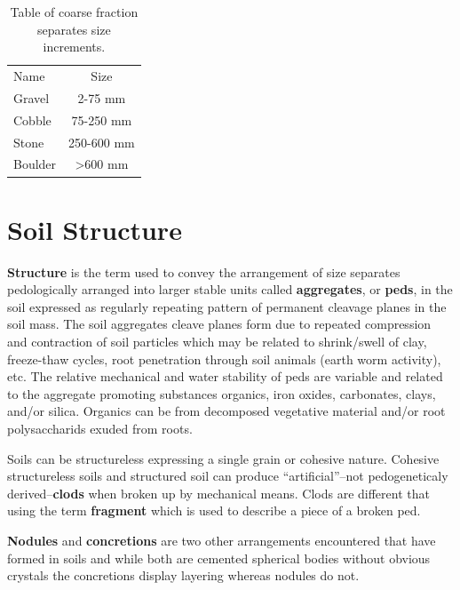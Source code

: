 \documentclass[letterpaper, 12pt]{article}
\begin{document}
\begin{table}[!htbp]
\centering
\caption{Table of coarse fraction separates size increments.}
\label{tab:coarsefractionsizenames}
\begin{tabular}{|l c|}
\hline
Name        &  Size                \\ \hhline{|==|}
Gravel      & 2-75 mm              \\
Cobble      & 75-250 mm            \\
Stone       & 250-600 mm           \\
Boulder     & \textgreater{}600 mm \\
\hline
\end{tabular}
\end{table}

    
\section{Soil Structure}
\label{structure}
    
\textbf{Structure} is the term used to convey the arrangement of size separates pedologically arranged into larger stable units called \textbf{aggregates}, or \textbf{peds}, in the soil expressed as regularly repeating pattern of permanent cleavage planes in the soil mass. The soil aggregates cleave planes form due to repeated compression and contraction of soil particles which may be related to shrink/swell of clay, freeze-thaw cycles, root penetration through soil animals (earth worm activity), etc. The relative mechanical and water stability of peds are variable and related to the aggregate promoting substances organics, iron oxides, carbonates, clays, and/or silica. Organics can be from decomposed vegetative material and/or root polysaccharids exuded from roots.
    
Soils can be structureless expressing a single grain or cohesive nature. Cohesive structureless soils and structured soil can produce \enquote{artificial}–not pedogeneticaly derived–\textbf{clods} when broken up by mechanical means. Clods are different that using the term \textbf{fragment} which is used to describe a piece of a broken ped.
    
\textbf{Nodules} and \textbf{concretions} are two other arrangements encountered that have formed in soils and while both are cemented spherical bodies without obvious crystals the concretions display layering whereas nodules do not.
    
\end{document}
